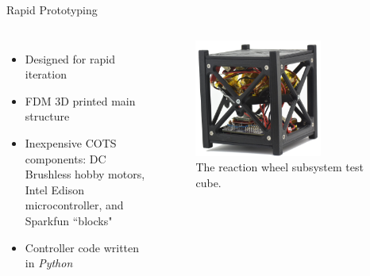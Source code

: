 \documentclass[slidestop,compress]{beamer}
\begin{document}
\begin{frame}[plain]
\begin{block}{\vspace{0.5cm}

\centering Rapid Prototyping}
\begin{columns}
\begin{itemize}
\item Designed for rapid iteration
\item FDM 3D printed main structure
\item Inexpensive COTS components: DC Brushless hobby motors, Intel Edison microcontroller, and Sparkfun ``blocks"
\item Controller code written in \emph{Python}
\end{itemize}
\begin{figure}[!ht]
\centering
{\includegraphics[width=0.7\textwidth]{DSC_1415.JPG}
\caption{The reaction wheel subsystem test cube.}
} 
\end{figure}
\end{columns}

\vspace{0.5 cm}
\end{block}    
\end{frame}
\end{document}
